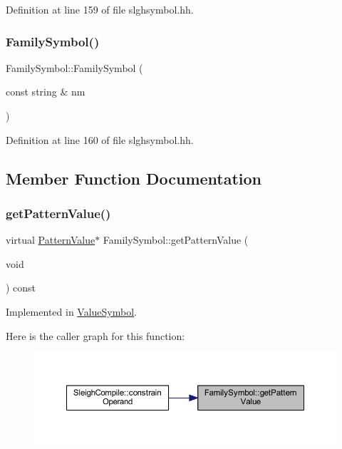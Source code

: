 Definition at line 159 of file slghsymbol.\+hh.

\mbox{\label{class_family_symbol_a8bf641754f7706d9b5facb5d5a7f760b}} 
\subsubsection{\texorpdfstring{FamilySymbol()}{FamilySymbol()}\hspace{0.1cm}{\footnotesize\ttfamily [2/2]}}
{\footnotesize\ttfamily Family\+Symbol\+::\+Family\+Symbol (\begin{DoxyParamCaption}\item[{const string \&}]{nm }\end{DoxyParamCaption})\hspace{0.3cm}{\ttfamily [inline]}}



Definition at line 160 of file slghsymbol.\+hh.



\subsection{Member Function Documentation}
\mbox{\label{class_family_symbol_a4918a769969008aeaa7a5cbe0eff90ac}} 
\subsubsection{\texorpdfstring{getPatternValue()}{getPatternValue()}}
{\footnotesize\ttfamily virtual \mbox{\hyperlink{class_pattern_value}{Pattern\+Value}}$\ast$ Family\+Symbol\+::get\+Pattern\+Value (\begin{DoxyParamCaption}\item[{void}]{ }\end{DoxyParamCaption}) const\hspace{0.3cm}{\ttfamily [pure virtual]}}



Implemented in \mbox{\hyperlink{class_value_symbol_a449457fadde51b9fe2c3a8d3a76966c9}{Value\+Symbol}}.

Here is the caller graph for this function\+:
\nopagebreak
\begin{figure}[H]
\begin{center}
\leavevmode
\includegraphics[width=350pt]{class_family_symbol_a4918a769969008aeaa7a5cbe0eff90ac_icgraph}
\end{center}
\end{figure}


